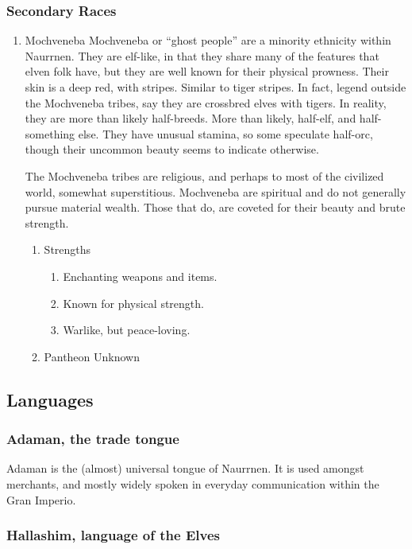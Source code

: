 \documentclass[11pt]{article}
\begin{document}
\subsubsection{Secondary Races}
\label{sec:orgca7a237}
\begin{enumerate}
\item Mochveneba
\label{sec:org9f72390}
Mochveneba or ``ghost people'' are a minority ethnicity within Naurrnen. They are elf-like, in that they share many of the features that elven folk have, but they are well known for their physical prowness. Their skin is a deep red, with stripes. Similar to tiger stripes. In fact, legend outside the Mochveneba tribes, say they are crossbred elves with tigers. In reality, they are more than likely half-breeds. More than likely, half-elf, and half-something else. They have unusual stamina, so some speculate half-orc, though their uncommon beauty seems to indicate otherwise.

The Mochveneba tribes are religious, and perhaps to most of the civilized world, somewhat superstitious. Mochveneba are spiritual and do not generally pursue material wealth. Those that do, are coveted for their beauty and brute strength.
\begin{enumerate}
\item Strengths
\label{sec:org25b2e55}
\begin{enumerate}
\item Enchanting weapons and items.
\item Known for physical strength.
\item Warlike, but peace-loving.
\end{enumerate}
\item Pantheon
\label{sec:org7aad868}
Unknown
\end{enumerate}
\end{enumerate}

\subsection{Languages}
\label{sec:org3f23478}
\subsubsection{Adaman, the trade tongue}
\label{sec:org22a3d81}
Adaman is the (almost) universal tongue of Naurrnen. It is used amongst merchants, and mostly widely spoken in everyday communication within the Gran Imperio.
\subsubsection{Hallashim, language of the Elves}
\label{sec:orgc37d911}
\end{document}

